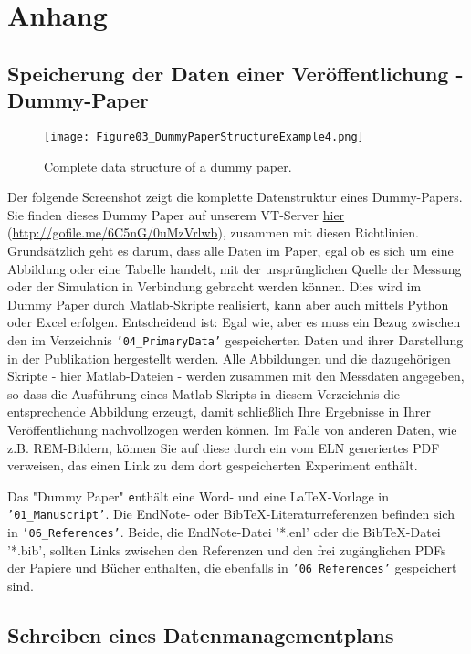 \pagebreak
\section{Anhang}
\subsection{Speicherung der Daten einer Veröffentlichung -
            \glqq Dummy-Paper\grqq{}}\label{app:dummy-paper}
\begin{wrapfigure}{r}{0.5\linewidth}
  \vspace{-1em}
  \texttt{[image: Figure03\_DummyPaperStructureExample4.png]}
  \caption{Complete data structure of a dummy paper.}
  \label{fig:dummy-paper}
\end{wrapfigure}
Der folgende Screenshot zeigt die komplette Datenstruktur eines Dummy-Papers.
Sie finden dieses Dummy Paper auf unserem VT-Server
\href{http://gofile.me/6C5nG/0uMzVrlwb}{hier}
(\url{http://gofile.me/6C5nG/0uMzVrlwb}),
zusammen mit diesen Richtlinien. Grundsätzlich geht es darum, dass alle Daten im
Paper, egal ob es sich um eine Abbildung oder eine Tabelle handelt, mit der
ursprünglichen Quelle der Messung oder der Simulation in Verbindung gebracht
werden können. Dies wird im Dummy Paper durch Matlab-Skripte realisiert, kann
aber auch mittels Python oder Excel erfolgen. Entscheidend ist: Egal wie, aber
es muss ein Bezug zwischen den im Verzeichnis \texttt{'04\_PrimaryData'}
gespeicherten Daten und ihrer Darstellung in der Publikation hergestellt werden. Alle
Abbildungen und die dazugehörigen Skripte - hier Matlab-Dateien - werden
zusammen mit den Messdaten angegeben, so dass die Ausführung eines
Matlab-Skripts in diesem Verzeichnis die entsprechende Abbildung erzeugt, damit
schließlich Ihre Ergebnisse in Ihrer Veröffentlichung nachvollzogen werden
können. Im Falle von anderen Daten, wie z.B. REM-Bildern, können Sie auf diese
durch ein vom ELN generiertes PDF verweisen, das einen Link zu dem dort
gespeicherten Experiment enthält.

Das "Dummy Paper" \verb+e+nthält eine Word- und eine LaTeX-Vorlage in
\texttt{'01\_Manuscript'}. Die EndNote- oder BibTeX-Literaturreferenzen
befinden sich in \texttt{'06\_References'}. Beide, die EndNote-Datei '*.enl'
oder die BibTeX-Datei '*.bib', sollten Links zwischen den Referenzen und den
frei zugänglichen PDFs der Papiere und Bücher enthalten, die ebenfalls in
\texttt{'06\_References'} gespeichert sind.

\subsection{Schreiben eines Datenmanagementplans}

